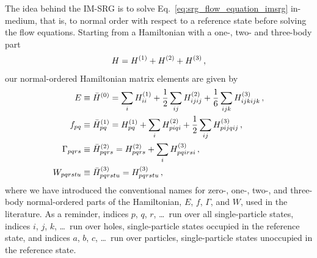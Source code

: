 The idea behind the IM-SRG is to solve Eq.~\ref{eq:srg_flow_equation_imsrg} in-medium,
that is, to normal order with respect to a reference state before solving the flow equations.
Starting from a Hamiltonian with a one-, two- and three-body part
\begin{equation}
  H = {H}^{(1)} + {H}^{(2)} + {H}^{(3)}\,,
\end{equation}
our normal-ordered Hamiltonian matrix elements are given by
\begin{align}
  E &\equiv {\bar{H}}^{(0)} = \sum_i {H}^{(1)}_{ii} + \frac{1}{2}\sum_{ij} {H}^{(2)}_{ijij} + \frac{1}{6} \sum_{ijk} {H}^{(3)}_{ijkijk}\,, \\
  f_{pq} &\equiv {\bar{H}}^{(1)}_{pq} = {H}^{(1)}_{pq} + \sum_i {H}^{(2)}_{piqi} + \frac{1}{2} \sum_{ij} {H}^{(3)}_{pijqij} \,, \\
  \Gamma_{pqrs} &\equiv {\bar{H}}^{(2)}_{pqrs} = {H}^{(2)}_{pqrs} + \sum_i {H}^{(3)}_{pqirsi} \,,  \\
  W_{pqrstu} &\equiv {\bar{H}}^{(3)}_{pqrstu} = {H}^{(3)}_{pqrstu} \,,
\end{align}
where we have introduced the conventional names
for zero-, one-, two-, and three-body normal-ordered parts of the Hamiltonian,
$E$, $f$, $\Gamma$, and $W$,
used in the literature.
As a reminder,
indices $p$, $q$, $r$, \ldots\ run over all single-particle states,
indices $i$, $j$, $k$, \ldots\ run over holes,
single-particle states occupied in the reference state,
and indices $a$, $b$, $c$, \ldots\ run over particles,
single-particle states unoccupied in the reference state.

